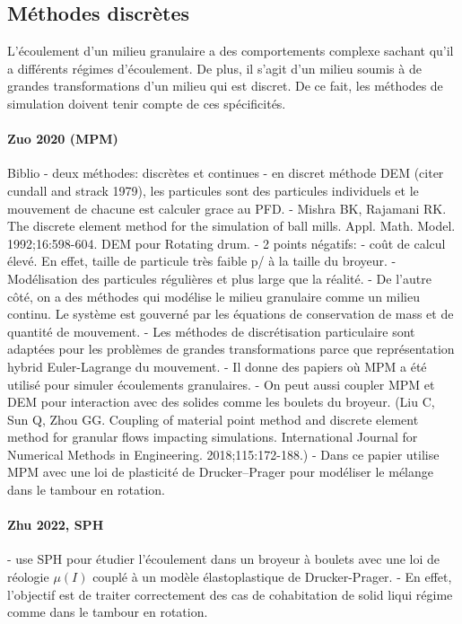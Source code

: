 \subsection{Méthodes discrètes}

L'écoulement d'un milieu granulaire a des comportements complexe sachant qu'il a différents régimes d'écoulement.
De plus, il s'agit d'un milieu soumis à de grandes transformations d'un milieu qui est discret.
De ce fait, les méthodes de simulation doivent tenir compte de ces spécificités.


\paragraph*{Zuo 2020 (MPM)}
Biblio
- deux méthodes: discrètes et continues
- en discret méthode DEM (citer cundall and strack 1979), les particules sont des particules individuels et le mouvement de chacune est calculer grace au PFD.
- Mishra BK, Rajamani RK. The discrete element method for the simulation of ball mills. Appl. Math. Model. 1992;16:598-604. DEM pour Rotating drum.
- 2 points négatifs:
- coût de calcul élevé. En effet, taille de particule très faible p/ à la taille du broyeur.
- Modélisation des particules régulières et plus large que la réalité.
- De l'autre côté, on a des méthodes qui modélise le milieu granulaire comme un milieu continu. Le système est gouverné par les équations de conservation de mass et de quantité de mouvement.
- Les méthodes de discrétisation particulaire sont adaptées pour les problèmes de grandes transformations parce que représentation hybrid Euler-Lagrange du mouvement.
- Il donne des papiers où MPM a été utilisé pour simuler écoulements granulaires.
- On peut aussi coupler MPM et DEM pour interaction avec des solides comme les boulets du broyeur. (Liu C, Sun Q, Zhou GG. Coupling of material point method and discrete element method for granular flows impacting simulations. International Journal for Numerical Methods in Engineering. 2018;115:172-188.)
- Dans ce papier utilise MPM avec une loi de plasticité de Drucker–Prager pour modéliser le mélange dans le tambour en rotation.

\paragraph*{Zhu 2022, SPH}
- use SPH pour étudier l'écoulement dans un broyeur à boulets avec une loi de réologie $\mu (I)$ couplé à un modèle élastoplastique de Drucker-Prager.
- En effet, l'objectif est de traiter correctement des cas de cohabitation de solid liqui régime comme dans le tambour en rotation.

